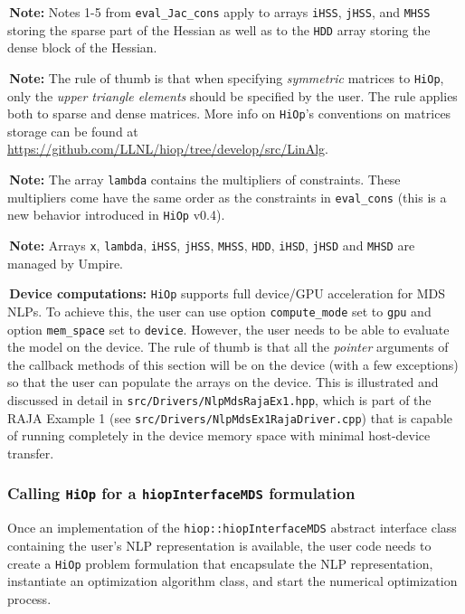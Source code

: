 \documentclass[11pt]{article}
\newcommand{\warningSymbol}{\raisebox{0.9\depth}{\danger}}
\newcommand{\warningcp}[1]{%
        \smallskip \noindent \textcolor{warningColorText}{\warningSymbol{}}\,\textbf{#1} %
    }
\newcommand{\Hi}{\texttt{HiOp}\xspace}
\begin{document}
 
\warningcp{Note:} Notes 1-5 from \texttt{eval\_Jac\_cons} apply to arrays \texttt{iHSS}, \texttt{jHSS}, and \texttt{MHSS} storing the sparse part of the Hessian as well as to the \texttt{HDD} array storing the dense block of the Hessian. 

\warningcp{Note:} The rule of thumb is that when specifying \textit{symmetric} matrices to \Hi, only the \textit{upper triangle elements} should be specified by the user. The rule applies both to sparse and dense matrices. More info on \Hi's conventions on matrices storage can be found at \url{https://github.com/LLNL/hiop/tree/develop/src/LinAlg}.


\warningcp{Note:} The array \texttt{lambda} contains  the multipliers of constraints. These multipliers come have the same order as the constraints in \texttt{eval\_cons} (this is a new behavior introduced in \Hi v0.4).

\warningcp{Note:} Arrays \texttt{x}, \texttt{lambda}, \texttt{iHSS}, \texttt{jHSS}, \texttt{MHSS}, \texttt{HDD}, \texttt{iHSD}, \texttt{jHSD} and \texttt{MHSD} are managed by Umpire.

\warningcp{Device computations:} \Hi supports full device/GPU acceleration for MDS NLPs. To achieve this, the user can use option \texttt{compute\_mode} set to \texttt{gpu} and option \texttt{mem\_space} set to \texttt{device}. However, the user needs to be able to evaluate the model on the device. The rule of thumb is that all the \textit{pointer} arguments of the callback methods of this section will be on the device (with a few exceptions) so that the user can populate the arrays on the device. This is illustrated and discussed in detail in \texttt{src/Drivers/NlpMdsRajaEx1.hpp}, which is part of the RAJA Example 1 (see \texttt{src/Drivers/NlpMdsEx1RajaDriver.cpp}) that is capable of running completely in the device memory space with minimal host-device transfer.

\subsubsection{Calling \Hi for a \texttt{hiopInterfaceMDS} formulation}
Once an implementation of the \texttt{hiop::hiopInterfaceMDS} abstract interface class containing the user's NLP representation is available, the  user code needs to create a \Hi problem formulation that encapsulate the NLP representation, instantiate an optimization algorithm class, and start the numerical optimization process. 
\end{document}
